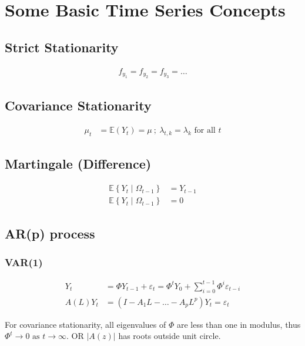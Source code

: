 \section{Some Basic Time Series Concepts}

\subsection{Strict Stationarity}

\begin{align*}
    f_{y_1}=f_{y_2}=f_{y_3}=\ldots
\end{align*}

\subsection{Covariance Stationarity}

\begin{align*}
    \mu_t&=\mathbb{E}\left(Y_t\right)=\mu \:;\:
    \lambda_{t, k}=\lambda_k \text { for all } t
\end{align*}

\subsection{Martingale (Difference)}

\begin{align*}
    \tag{M}
    \mathbb{E}\left\{Y_t \mid \Omega_{t-1}\right\}&=Y_{t-1} \\
    \tag{MDS}
    \mathbb{E}\left\{Y_t \mid \Omega_{t-1}\right\}&=0
\end{align*}

\subsection{AR(p) process}

\subsubsection{VAR(1)}

\begin{align*}
    Y_t &= \Phi Y_{t-1}+\varepsilon_t =\Phi^t Y_0+\sum_{i=0}^{t-1} \Phi^i \varepsilon_{t-i} \\
    A(L) Y_t &= (I-A_1 L-\ldots-A_p L^p)Y_t = \varepsilon_t
\end{align*}

For covariance stationarity, all eigenvalues of $\Phi$ are less than one in modulus, thus $\Phi^t \rightarrow 0 \text { as } t \rightarrow \infty$. 
OR
$|A(z)|$ has roots outside unit circle.


